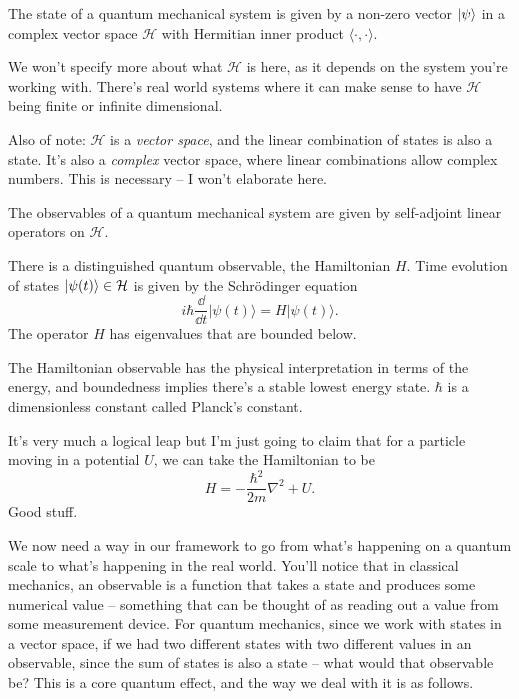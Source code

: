 \documentclass[a4paper]{scrartcl}
\begin{document}
\begin{axiom}[States]
    The state of a quantum mechanical system is given by a non-zero vector $\ket{\psi}$ in a complex vector space $\mathcal{H}$ with Hermitian inner product $\langle \cdot, \cdot \rangle$.
\end{axiom}

We won't specify more about what $\mathcal{H}$ is here, as it depends on the system you're working with. There's real world systems where it can make sense to have $\mathcal{H}$ being finite or infinite dimensional.

Also of note: $\mathcal{H}$ is a \emph{vector space}, and the linear combination of states is also a state. It's also a \emph{complex} vector space, where linear combinations allow complex numbers. This is necessary -- I won't elaborate here.

\begin{axiom}[Observables]
    The observables of a quantum mechanical system are given by self-adjoint linear operators on $\mathcal{H}$.
\end{axiom}

\begin{axiom}[Dynamics]
    There is a distinguished quantum observable, the Hamiltonian $H$. Time evolution of states $\ket{\psi(t)} \in \mathcal{H}$ is given by the Schrödinger equation
    $$
    i \hbar \frac{\dd}{\dd t}|\psi(t)\rangle=H|\psi(t)\rangle.
    $$
    The operator $H$ has eigenvalues that are bounded below.
\end{axiom}

The Hamiltonian observable has the physical interpretation in terms of the energy, and boundedness implies there's a stable lowest energy state. 
$\hbar$ is a dimensionless constant called Planck's constant.

It's very much a logical leap but I'm just going to claim that for a particle moving in a potential $U$, we can take the Hamiltonian to be
$$
H = -\frac{\hbar^{2}}{2 m} \nabla^{2}+U.
$$
Good stuff.

We now need a way in our framework to go from what's happening on a quantum scale to what's happening in the real world. You'll notice that in classical mechanics, an observable is a function that takes a state and produces some numerical value -- something that can be thought of as reading out a value from some measurement device. For quantum mechanics, since we work with states in a vector space, if we had two different states with two different values in an observable, since the sum of states is also a state -- what would that observable be? This is a core quantum effect, and the way we deal with it is as follows.
\end{document}
